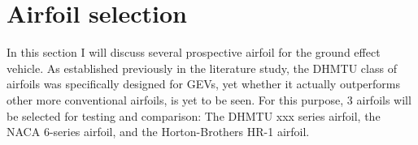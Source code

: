 
\section{Airfoil selection}
\label{sec:airfoil-selection}

In this section I will discuss several prospective airfoil for the ground effect vehicle. As established previously in the literature study, the DHMTU class of airfoils was specifically designed for GEVs, yet whether it actually outperforms other more conventional airfoils, is yet to be seen. For this purpose, 3 airfoils will be selected for testing and comparison: The DHMTU xxx series airfoil, the NACA 6-series airfoil, and the Horton-Brothers HR-1 airfoil. %

\newpage
